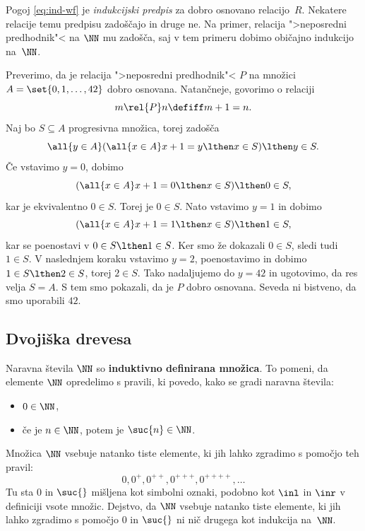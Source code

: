 Pogoj \eqref{eq:ind-wf} je \emph{indukcijski predpis} za dobro osnovano relacijo~$R$. Nekatere relacije temu predpisu zadoščajo in druge ne. Na primer, relacija ">neposredni predhodnik"< na $\NN$ mu zadošča, saj v tem primeru dobimo običajno indukcijo na~$\NN$.

\begin{zgled}
  Preverimo, da je relacija ">neposredni predhodnik"< $P$ na množici $A = \set{0, 1, \ldots, 42}$ dobro osnovana.
  Natančneje, govorimo o relaciji
  \begin{equation*}
    m \rel{P} n \defiff m + 1 = n.
  \end{equation*}
  Naj bo $S \subseteq A$ progresivna množica, torej zadošča
  \begin{equation*}
    \all{y \in A} (\all{x \in A} x + 1 = y \lthen x \in S) \lthen y \in S.
  \end{equation*}
  Če vstavimo $y = 0$, dobimo
  \begin{equation*}
    (\all{x \in A} x + 1 = 0 \lthen x \in S) \lthen 0 \in S,
  \end{equation*}
  kar je ekvivalentno $0 \in S$. Torej je $0 \in S$. Nato vstavimo $y = 1$ in dobimo
  \begin{equation*}
    (\all{x \in A} x + 1 = 1 \lthen x \in S) \lthen 1 \in S,
  \end{equation*}
  kar se poenostavi v $0 \in S \lthen 1 \in S$. Ker smo že dokazali $0 \in S$, sledi tudi $1 \in S$. V naslednjem koraku vstavimo $y = 2$, poenostavimo in dobimo $1 \in S \lthen 2 \in S$, torej $2 \in S$. Tako nadaljujemo do $y = 42$ in ugotovimo, da res velja $S = A$. S tem smo pokazali, da je $P$ dobro osnovana. Seveda ni bistveno, da smo uporabili $42$.
\end{zgled}

\subsection{Dvojiška drevesa}

Naravna števila $\NN$ so \textbf{induktivno definirana množica}. To pomeni, da elemente $\NN$
opredelimo s pravili, ki povedo, kako se gradi naravna števila:
%
\begin{itemize}
\item $0 \in \NN$,
\item če je $n \in \NN$, potem je $\suc{n} \in \NN$.
\end{itemize}
%
Množica $\NN$ vsebuje natanko tiste elemente, ki jih lahko zgradimo s pomočjo teh pravil:
%
\begin{equation*}
    0, 0^{+}, 0^{++}, 0^{+++}, 0^{++++}, \ldots
\end{equation*}
%
Tu sta $0$ in $\suc{{}}$ mišljena kot simbolni oznaki, podobno kot $\inl$ in $\inr$ v definiciji vsote množic. Dejstvo,
da $\NN$ vsebuje natanko tiste elemente, ki jih lahko zgradimo s pomočjo $0$ in $\suc{{}}$ ni nič drugega kot indukcija
na~$\NN$.

